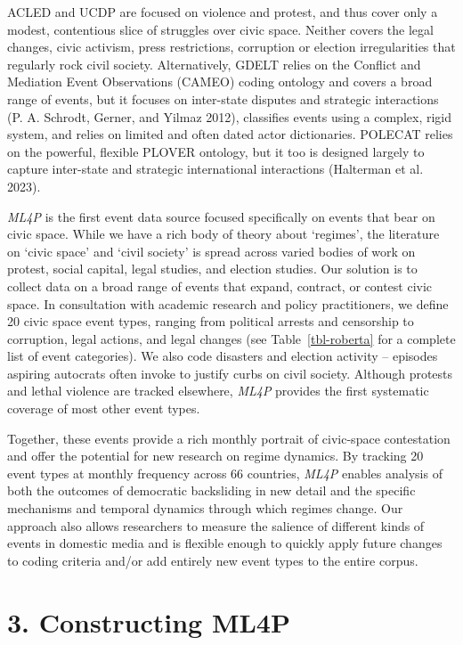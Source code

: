 \documentclass[
  letterpaper,
  DIV=11,
  numbers=noendperiod]{scrartcl}
\begin{document}
ACLED and UCDP are focused on violence and protest, and thus cover only
a modest, contentious slice of struggles over civic space. Neither
covers the legal changes, civic activism, press restrictions, corruption
or election irregularities that regularly rock civil society.
Alternatively, GDELT relies on the Conflict and Mediation Event
Observations (CAMEO) coding ontology and covers a broad range of events,
but it focuses on inter-state disputes and strategic interactions (P. A.
Schrodt, Gerner, and Yilmaz 2012), classifies events using a complex,
rigid system, and relies on limited and often dated actor dictionaries.
POLECAT relies on the powerful, flexible PLOVER ontology, but it too is
designed largely to capture inter-state and strategic international
interactions (Halterman et al. 2023).

\emph{ML4P} is the first event data source focused specifically on
events that bear on civic space. While we have a rich body of theory
about `regimes', the literature on `civic space' and `civil society' is
spread across varied bodies of work on protest, social capital, legal
studies, and election studies. Our solution is to collect data on a
broad range of events that expand, contract, or contest civic space. In
consultation with academic research and policy practitioners, we define
20 civic space event types, ranging from political arrests and
censorship to corruption, legal actions, and legal changes (see
Table~\ref{tbl-roberta} for a complete list of event categories). We
also code disasters and election activity -- episodes aspiring autocrats
often invoke to justify curbs on civil society. Although protests and
lethal violence are tracked elsewhere, \emph{ML4P} provides the first
systematic coverage of most other event types.

Together, these events provide a rich monthly portrait of civic-space
contestation and offer the potential for new research on regime
dynamics. By tracking 20 event types at monthly frequency across 66
countries, \emph{ML4P} enables analysis of both the outcomes of
democratic backsliding in new detail and the specific mechanisms and
temporal dynamics through which regimes change. Our approach also allows
researchers to measure the salience of different kinds of events in
domestic media and is flexible enough to quickly apply future changes to
coding criteria and/or add entirely new event types to the entire
corpus.

\hypertarget{sec-data}{%
\section{3. Constructing ML4P}\label{sec-data}}
\end{document}
